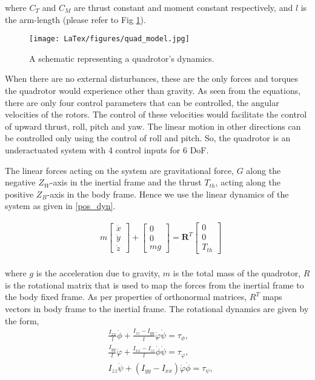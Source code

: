 where $C_T$ and $C_M$ are thrust constant and moment constant respectively, and $l$ is the arm-length (please refer to Fig \ref{fig:quad_model}).

\begin{figure}
	\centering
	\texttt{[image: LaTex/figures/quad\_model.jpg]}
	\caption{{A schematic representing a quadrotor's dynamics.}}\label{fig:quad_model}
\end{figure}

When there are no external disturbances, these are the only forces and torques the quadrotor would experience other than gravity. As seen from the equations, there are only four control parameters that can be controlled, the angular velocities of the rotors. The control of these velocities would facilitate the control of upward thrust, roll, pitch and yaw. The linear motion in other directions can be controlled only using the control of roll and pitch. So, the quadrotor is an underactuated system with 4 control inputs for 6 DoF.

The linear forces acting on the system are gravitational force, $G$ along the negative $Z_W$-axis in the inertial frame and the thrust $T_{th}$, acting along the positive $Z_B$-axis in the body frame. Hence we use the linear dynamics of the system as given in \ref{pos_dyn}.

\begin{align}\label{pos_dyn}
    &m 
    \begin{bmatrix}
        \ddot{x}\\ 
        \ddot{y}\\ 
        \ddot{z}
    \end{bmatrix} + 
    \begin{bmatrix}
        0\\ 
        0\\ 
        mg
    \end{bmatrix} = \mathbf{R}^T 
    \begin{bmatrix}
        0\\ 
        0\\
        T_{th}
    \end{bmatrix}
\end{align}\\

where $g$ is the acceleration due to gravity, $m$ is the total mass of the quadrotor, $R$ is the rotational matrix that is used to map the forces from the inertial frame to the body fixed frame. As per properties of orthonormal matrices, $R^T$ maps vectors in body frame to the inertial frame. The rotational dynamics are given by the form,
\begin{align}
    &\frac{I_{xx}}{l}\ddot{\phi} + \frac{I_{zz}-I_{yy}}{l}\dot{\varphi}\dot{\psi} = \tau_\phi,\nonumber\\
&\frac{I_{yy}}{l}\ddot{\varphi} + \frac{I_{xx}-I_{zz}}{l}\dot{\phi}\dot{\psi}= \tau_\varphi, \nonumber\\
& I_{zz}\ddot{\psi} + (I_{yy}-I_{xx})\dot{\varphi}\dot{\phi}= \tau_\psi, 
\end{align} \label{att_sub}

